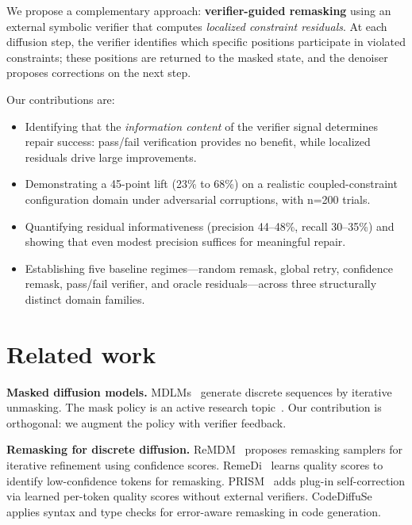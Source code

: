 \documentclass[11pt,a4paper,twoside]{article}
\theoremstyle{definition}
\begin{document}
We propose a complementary approach: \textbf{verifier-guided remasking} using an external symbolic verifier that computes \emph{localized constraint residuals}. At each diffusion step, the verifier identifies which specific positions participate in violated constraints; these positions are returned to the masked state, and the denoiser proposes corrections on the next step.

Our contributions are:
\begin{itemize}[leftmargin=2em]
  \item Identifying that the \emph{information content} of the verifier signal determines repair success: pass/fail verification provides no benefit, while localized residuals drive large improvements.
  \item Demonstrating a 45-point lift (23\% to 68\%) on a realistic coupled-constraint configuration domain under adversarial corruptions, with n=200 trials.
  \item Quantifying residual informativeness (precision 44--48\%, recall 30--35\%) and showing that even modest precision suffices for meaningful repair.
  \item Establishing five baseline regimes---random remask, global retry, confidence remask, pass/fail verifier, and oracle residuals---across three structurally distinct domain families.
\end{itemize}

\section{Related work}
\label{sec:related}

\textbf{Masked diffusion models.} MDLMs~\cite{austin2021structured,chang2022masked,savinov2021step} generate discrete sequences by iterative unmasking. The mask policy is an active research topic~\cite{ou2024mdlm}. Our contribution is orthogonal: we augment the policy with verifier feedback.

\textbf{Remasking for discrete diffusion.} ReMDM~\cite{remdm2025} proposes remasking samplers for iterative refinement using confidence scores. RemeDi~\cite{remedi2025} learns quality scores to identify low-confidence tokens for remasking. PRISM~\cite{prism2025} adds plug-in self-correction via learned per-token quality scores without external verifiers. CodeDiffuSe~\cite{codediffuse} applies syntax and type checks for error-aware remasking in code generation.
\end{document}
